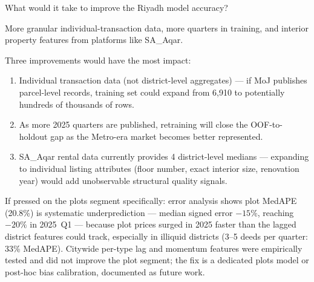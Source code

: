 \documentclass[11pt, a4paper, twoside]{article}
\begin{document}
\bigskip

\begin{question}{What would it take to improve the Riyadh model accuracy?}
\begin{shortanswer}
More granular individual-transaction data, more quarters in training, and
interior property features from platforms like SA\_Aqar.
\end{shortanswer}

\begin{detail}
Three improvements would have the most impact:
\begin{enumerate}
  \item Individual transaction data (not district-level aggregates) --- if MoJ
        publishes parcel-level records, training set could expand from 6,910 to
        potentially hundreds of thousands of rows.
  \item As more 2025 quarters are published, retraining will close the
        OOF-to-holdout gap as the Metro-era market becomes better represented.
  \item SA\_Aqar rental data currently provides 4 district-level medians ---
        expanding to individual listing attributes (floor number, exact interior
        size, renovation year) would add unobservable structural quality signals.
\end{enumerate}
If pressed on the plots segment specifically: error analysis shows plot MedAPE
(20.8\%) is systematic underprediction --- median signed error $-15\%$, reaching
$-20\%$ in 2025~Q1 --- because plot prices surged in 2025 faster than the lagged
district features could track, especially in illiquid districts (3--5 deeds per
quarter: 33\% MedAPE). Citywide per-type lag and momentum features were
empirically tested and did not improve the plot segment; the fix is a dedicated
plots model or post-hoc bias calibration, documented as future work.
\end{detail}
\end{question}

\bigskip
\end{document}
